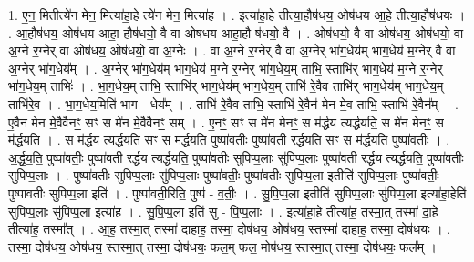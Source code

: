 \documentclass[17pt]{extarticle}
\begin{document}
1. ए॒न॒ मितीत्ये॑न मेन॒ मित्या॑हा॒हे त्ये॑न मेन॒ मित्या॑ह । . इत्या॑हा॒हे तीत्या॒हौष॑धय॒ ओष॑धय आ॒हे तीत्या॒हौष॑धयः । . आ॒हौष॑धय॒ ओष॑धय आहा॒ हौष॑धयो॒ वै वा ओष॑धय आहा॒हौ ष॑धयो॒ वै । . ओष॑धयो॒ वै वा ओष॑धय॒ ओष॑धयो॒ वा अ॒ग्ने र॒ग्नेर् वा ओष॑धय॒ ओष॑धयो॒ वा अ॒ग्नेः । . वा अ॒ग्ने र॒ग्नेर् वै वा अ॒ग्नेर् भा॑ग॒धेय॑म् भाग॒धेय॑ म॒ग्नेर् वै वा अ॒ग्नेर् भा॑ग॒धेय᳚म् । . अ॒ग्नेर् भा॑ग॒धेय॑म् भाग॒धेय॑ म॒ग्ने र॒ग्नेर् भा॑ग॒धेय॒म् ताभि॒ स्ताभि॑र् भाग॒धेय॑ म॒ग्ने र॒ग्नेर् भा॑ग॒धेय॒म् ताभिः॑ । . भा॒ग॒धेय॒म् ताभि॒ स्ताभि॑र् भाग॒धेय॑म् भाग॒धेय॒म् ताभि॑ रे॒वैव ताभि॑र् भाग॒धेय॑म् भाग॒धेय॒म् ताभि॑रे॒व । . भा॒ग॒धेय॒मिति॑ भाग - धेय᳚म् । . ताभि॑ रे॒वैव ताभि॒ स्ताभि॑ रे॒वैन॑ मेन मे॒व ताभि॒ स्ताभि॑ रे॒वैन᳚म् । . ए॒वैन॑ मेन मे॒वैवैनꣳ॒॒ सꣳ स मे॑न मे॒वैवैनꣳ॒॒ सम् । . ए॒नꣳ॒॒ सꣳ स मे॑न मेनꣳ॒॒ स म॑र्द्धय त्यर्द्धयति॒ स मे॑न मेनꣳ॒॒ स म॑र्द्धयति । . स म॑र्द्धय त्यर्द्धयति॒ सꣳ स म॑र्द्धयति॒ पुष्पा॑वतीः॒ पुष्पा॑वती रर्द्धयति॒ सꣳ स म॑र्द्धयति॒ पुष्पा॑वतीः । . अ॒र्द्ध॒य॒ति॒ पुष्पा॑वतीः॒ पुष्पा॑वती रर्द्धय त्यर्द्धयति॒ पुष्पा॑वतीः सुपिप्प॒लाः सु॑पिप्प॒लाः पुष्पा॑वती रर्द्धय त्यर्द्धयति॒ पुष्पा॑वतीः सुपिप्प॒लाः । . पुष्पा॑वतीः सुपिप्प॒लाः सु॑पिप्प॒लाः पुष्पा॑वतीः॒ पुष्पा॑वतीः सुपिप्प॒ला इतीति॑ सुपिप्प॒लाः पुष्पा॑वतीः॒ पुष्पा॑वतीः सुपिप्प॒ला इति॑ । . पुष्पा॑वती॒रिति॒ पुष्प॑ - व॒तीः॒ । . सु॒पि॒प्प॒ला इतीति॑ सुपिप्प॒लाः सु॑पिप्प॒ला इत्या॑हा॒हेति॑ सुपिप्प॒लाः सु॑पिप्प॒ला इत्या॑ह । . सु॒पि॒प्प॒ला इति॑ सु - पि॒प्प॒लाः । . इत्या॑हा॒हे तीत्या॑ह॒ तस्मा॒त् तस्मा॑ दा॒हे तीत्या॑ह॒ तस्मा᳚त् । . आ॒ह॒ तस्मा॒त् तस्मा॑ दाहाह॒ तस्मा॒ दोष॑धय॒ ओष॑धय॒ स्तस्मा॑ दाहाह॒ तस्मा॒ दोष॑धयः । . तस्मा॒ दोष॑धय॒ ओष॑धय॒ स्तस्मा॒त् तस्मा॒ दोष॑धयः॒ फल॒म् फल॒ मोष॑धय॒ स्तस्मा॒त् तस्मा॒ दोष॑धयः॒ फल᳚म् । \newline
\end{document}

